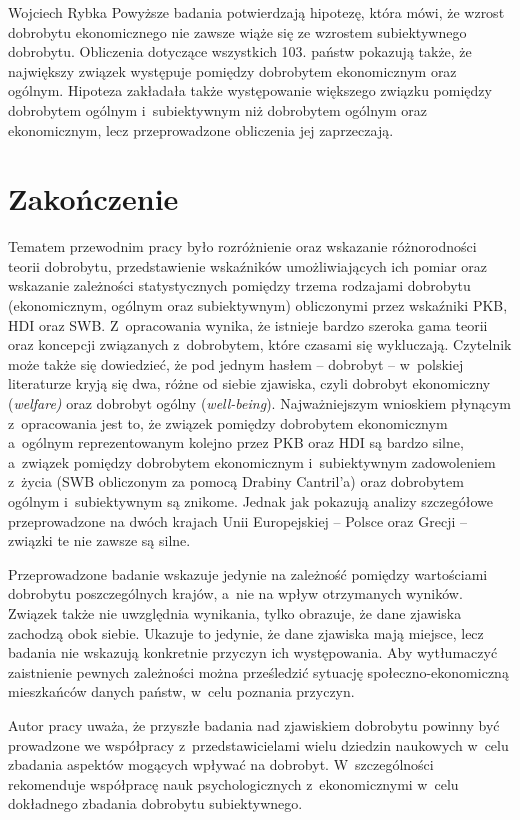 \begin{artplenv}{Wojciech Rybka}
Powyższe badania potwierdzają hipotezę, która mówi, że wzrost dobrobytu ekonomicznego nie zawsze wiąże się
ze wzrostem subiektywnego dobrobytu. Obliczenia dotyczące wszystkich 103. państw pokazują także, że największy związek
występuje pomiędzy dobrobytem ekonomicznym oraz ogólnym. Hipoteza zakładała także występowanie większego związku
pomiędzy dobrobytem ogólnym i~subiektywnym niż dobrobytem ogólnym oraz ekonomicznym, lecz przeprowadzone obliczenia jej
zaprzeczają.

\section{Zakończenie}
Tematem przewodnim pracy było rozróżnienie oraz wskazanie różnorodności teorii dobrobytu, przedstawienie wskaźników
umożliwiających ich pomiar oraz wskazanie zależności statystycznych pomiędzy trzema rodzajami dobrobytu (ekonomicznym,
ogólnym oraz subiektywnym) obliczonymi przez wskaźniki PKB, HDI oraz SWB. Z~opracowania wynika, że istnieje bardzo
szeroka gama teorii oraz koncepcji związanych z~dobrobytem, które czasami się wykluczają. Czytelnik może także się
dowiedzieć, że pod jednym hasłem -- dobrobyt -- w~polskiej literaturze kryją się dwa, różne od siebie zjawiska, czyli
dobrobyt ekonomiczny (\textit{welfare)} oraz dobrobyt ogólny (\textit{well-being}). Najważniejszym wnioskiem
płynącym z~opracowania jest to, że związek pomiędzy dobrobytem ekonomicznym a~ogólnym reprezentowanym kolejno przez PKB
oraz HDI są bardzo silne, a~związek pomiędzy dobrobytem ekonomicznym i~subiektywnym zadowoleniem z~życia (SWB
obliczonym za pomocą Drabiny Cantril’a) oraz dobrobytem ogólnym i~subiektywnym są znikome. Jednak jak pokazują analizy
szczegółowe przeprowadzone na dwóch krajach Unii Europejskiej -- Polsce oraz Grecji -- związki te nie zawsze są silne. 

Przeprowadzone badanie wskazuje jedynie na zależność pomiędzy wartościami dobrobytu poszczególnych krajów, a~nie na
wpływ otrzymanych wyników. Związek także nie uwzględnia wynikania, tylko obrazuje, że dane zjawiska zachodzą obok
siebie. Ukazuje to jedynie, że dane zjawiska mają miejsce, lecz badania nie wskazują konkretnie przyczyn ich
występowania. Aby wytłumaczyć zaistnienie pewnych zależności można prześledzić sytuację społeczno-ekonomiczną
mieszkańców danych państw, w~celu poznania przyczyn. 

Autor pracy uważa, że przyszłe badania nad zjawiskiem dobrobytu powinny być prowadzone we współpracy z~przedstawicielami
wielu dziedzin naukowych w~celu zbadania aspektów mogących wpływać na dobrobyt. W~szczególności rekomenduje współpracę
nauk psychologicznych z~ekonomicznymi w~celu dokładnego zbadania dobrobytu subiektywnego.

\end{artplenv}

